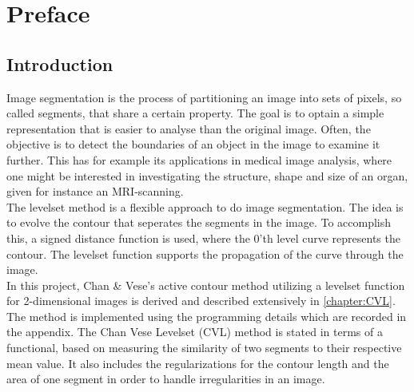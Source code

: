 
\chapter{Preface}\label{chapter:preface}
\section{Introduction}
Image segmentation is the process of partitioning an image into sets of pixels, so called segments, that share a certain property. The goal is to optain a simple representation that is easier to analyse than the original image. Often, the objective is to detect the boundaries of an object in the image to examine it further. This has for example its applications in medical image analysis, where one might be interested in investigating the structure, shape and size of an organ, given for instance an MRI-scanning.\\

The levelset method is a flexible approach to do image segmentation. The idea is to evolve the contour that seperates the segments in the image. To accomplish this, a signed distance function is used, where the 0'th level curve represents the contour. The levelset function supports the propagation of the curve through the image.\\

In this project, Chan \& Vese's active contour method \cite{chan.01} utilizing a levelset function for 2-dimensional images is derived and described extensively in \cref{chapter:CVL}. The method is implemented using the programming details which are recorded in the appendix. The Chan Vese Levelset (CVL) method is stated in terms of a functional, based on measuring the similarity of two segments to their respective mean value. It also includes the regularizations for the contour length and the area of one segment in order to handle irregularities in an image.\\

